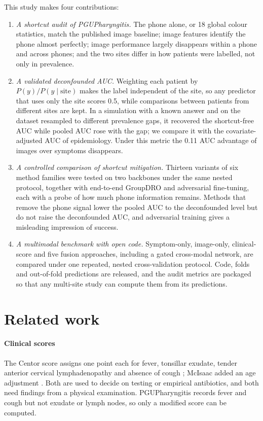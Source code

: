 \documentclass[preprint,12pt]{elsarticle}
\begin{document}
This study makes four contributions:
\begin{enumerate}
\item \textit{A shortcut audit of PGUPharyngitis.} The phone alone, or 18 global colour statistics, match the published image baseline; image features identify the phone almost perfectly; image performance largely disappears within a phone and across phones; and the two sites differ in how patients were labelled, not only in prevalence.
\item \textit{A validated deconfounded AUC.} Weighting each patient by $P(y)/P(y \mid \text{site})$ makes the label independent of the site, so any predictor that uses only the site scores 0.5, while comparisons between patients from different sites are kept. In a simulation with a known answer and on the dataset resampled to different prevalence gaps, it recovered the shortcut-free AUC while pooled AUC rose with the gap; we compare it with the covariate-adjusted AUC of epidemiology. Under this metric the 0.11 AUC advantage of images over symptoms disappears.
\item \textit{A controlled comparison of shortcut mitigation.} Thirteen variants of six method families were tested on two backbones under the same nested protocol, together with end-to-end GroupDRO and adversarial fine-tuning, each with a probe of how much phone information remains. Methods that remove the phone signal lower the pooled AUC to the deconfounded level but do not raise the deconfounded AUC, and adversarial training gives a misleading impression of success.
\item \textit{A multimodal benchmark with open code.} Symptom-only, image-only, clinical-score and five fusion approaches, including a gated cross-modal network, are compared under one repeated, nested cross-validation protocol. Code, folds and out-of-fold predictions are released, and the audit metrics are packaged so that any multi-site study can compute them from its predictions.
\end{enumerate}

\section{Related work}
\label{sec:related}

\paragraph{Clinical scores} The Centor score assigns one point each for fever, tonsillar exudate, tender anterior cervical lymphadenopathy and absence of cough \cite{centor1981}; McIsaac added an age adjustment \cite{mcisaac1998}. Both are used to decide on testing or empirical antibiotics, and both need findings from a physical examination. PGUPharyngitis records fever and cough but not exudate or lymph nodes, so only a modified score can be computed.
\end{document}
